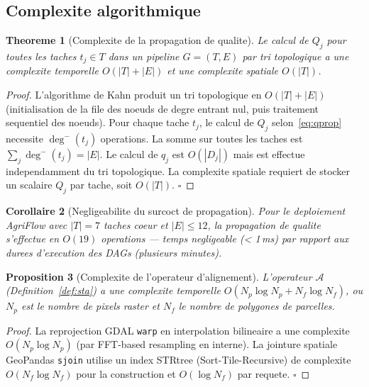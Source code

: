 \documentclass[12pt,a4paper]{article}
\theoremstyle{plain}
\newtheorem{theorem}{Theoreme}[section]
\newtheorem{proposition}[theorem]{Proposition}
\newtheorem{corollary}[theorem]{Corollaire}
\theoremstyle{definition}
\theoremstyle{remark}
\begin{document}
	\subsection{Complexite algorithmique}
	\label{subsec:complexity}
	
	\begin{theorem}[Complexite de la propagation de qualite]
		\label{thm:complexity}
		Le calcul de $Q_j$ pour toutes les taches $t_j \in T$ dans un pipeline
		$G=(T,E)$ par tri topologique a une complexite temporelle $O(|T|+|E|)$
		et une complexite spatiale $O(|T|)$.
	\end{theorem}
	
	\begin{proof}
		L'algorithme de Kahn produit un tri topologique en $O(|T|+|E|)$
		(initialisation de la file des noeuds de degre entrant nul, puis
		traitement sequentiel des noeuds). Pour chaque tache $t_j$, le calcul
		de $Q_j$ selon~\eqref{eq:qprop} necessite $\deg^{-}(t_j)$ operations.
		La somme sur toutes les taches est
		$\sum_{j} \deg^{-}(t_j) = |E|$. Le calcul de $q_j$ est $O(|D_j|)$
		mais est effectue independamment du tri topologique.
		La complexite spatiale requiert de stocker un scalaire $Q_j$ par tache,
		soit $O(|T|)$. \hfill$\square$
	\end{proof}
	
	\begin{corollary}[Negligeabilite du surcoct de propagation]
		Pour le deploiement AgriFlow avec $|T|=7$ taches coeur et $|E|\leq 12$,
		la propagation de qualite s'effectue en $O(19)$ operations --- temps
		negligeable (< 1\,ms) par rapport aux durees d'execution des DAGs
		(plusieurs minutes).
	\end{corollary}
	
	\begin{proposition}[Complexite de l'operateur d'alignement]
		\label{prop:sta_complexity}
		L'operateur $\mathcal{A}$ (Definition~\ref{def:sta}) a une complexite
		temporelle $O(N_p \log N_p + N_f \log N_f)$, ou $N_p$ est le nombre
		de pixels raster et $N_f$ le nombre de polygones de parcelles.
	\end{proposition}
	
	\begin{proof}
		La reprojection GDAL \texttt{warp} en interpolation bilineaire
		a une complexite $O(N_p \log N_p)$ (par FFT-based resampling en interne).
		La jointure spatiale GeoPandas \texttt{sjoin} utilise un index STRtree
		(Sort-Tile-Recursive) de complexite $O(N_f \log N_f)$ pour la construction
		et $O(\log N_f)$ par requete. \hfill$\square$
	\end{proof}
	
\end{document}
